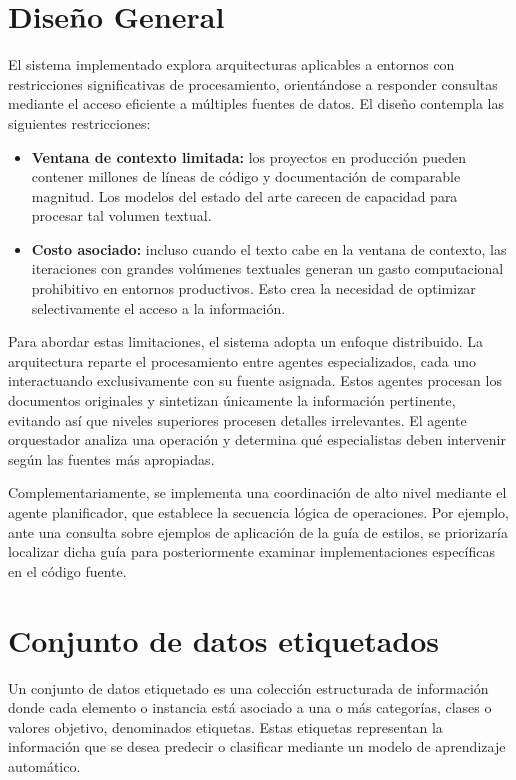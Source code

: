 \section{Diseño General}
\label{anexo:design}
El sistema implementado explora arquitecturas aplicables a entornos con restricciones significativas de procesamiento, orientándose a responder consultas mediante el acceso eficiente a múltiples fuentes de datos. El diseño contempla las siguientes restricciones: 
\begin{itemize}
\item\textbf{Ventana de contexto limitada: }los proyectos en producción pueden contener millones de líneas de código y documentación de comparable magnitud. Los modelos del estado del arte carecen de capacidad para procesar tal volumen textual.
  \item\textbf{Costo asociado: }incluso cuando el texto cabe en la ventana de contexto, las iteraciones con grandes volúmenes textuales generan un gasto computacional prohibitivo en entornos productivos. Esto crea la necesidad de optimizar selectivamente el acceso a la información.
\end{itemize}
Para abordar estas limitaciones, el sistema adopta un enfoque distribuido. La arquitectura reparte el procesamiento entre agentes especializados, cada uno interactuando exclusivamente con su fuente asignada. Estos agentes procesan los documentos originales y sintetizan únicamente la información pertinente, evitando así que niveles superiores procesen detalles irrelevantes. El agente orquestador analiza una operación y determina qué especialistas deben intervenir según las fuentes más apropiadas.

Complementariamente, se implementa una coordinación de alto nivel mediante el agente planificador, que establece la secuencia lógica de operaciones. Por ejemplo, ante una consulta sobre ejemplos de aplicación de la guía de estilos, se priorizaría localizar dicha guía para posteriormente examinar implementaciones específicas en el código fuente.

\section{Conjunto de datos etiquetados}
\label{anexo:datos_et}
Un conjunto de datos etiquetado es una colección estructurada de información donde cada elemento o instancia está asociado a una o más categorías, clases o valores objetivo, denominados etiquetas. Estas etiquetas representan la información que se desea predecir o clasificar mediante un modelo de aprendizaje automático.

